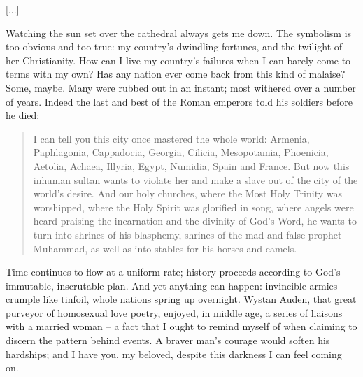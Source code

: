 [...]

Watching the sun set over the cathedral always gets me down. The symbolism is too obvious and too true: my country's dwindling fortunes, and the twilight of her Christianity. How can I live my country's failures when I can barely come to terms with my own? Has any nation ever come back from this kind of malaise? Some, maybe. Many were rubbed out in an instant; most withered over a number of years. Indeed the last and best of the Roman emperors told his soldiers before he died:

\begin{quote}
    I can tell you this city once mastered the whole world: Armenia, Paphlagonia, Cappadocia, Georgia, Cilicia, Mesopotamia, Phoenicia, Aetolia, Achaea, Illyria, Egypt, Numidia, Spain and France. But now this inhuman sultan wants to violate her and make a slave out of the city of the world's desire. And our holy churches, where the Most Holy Trinity was worshipped, where the Holy Spirit was glorified in song, where angels were heard praising the incarnation and the divinity of God's Word, he wants to turn into shrines of his blasphemy, shrines of the mad and false prophet Muhammad, as well as into stables for his horses and camels.
\end{quote}

Time continues to flow at a uniform rate; history proceeds according to God's immutable, inscrutable plan. And yet anything can happen: invincible armies crumple like tinfoil, whole nations spring up overnight. Wystan Auden, that great purveyor of homosexual love poetry, enjoyed, in middle age, a series of liaisons with a married woman -- a fact that I ought to remind myself of when claiming to discern the pattern behind events. A braver man's courage would soften his hardships; and I have you, my beloved, despite this darkness I can feel coming on.
